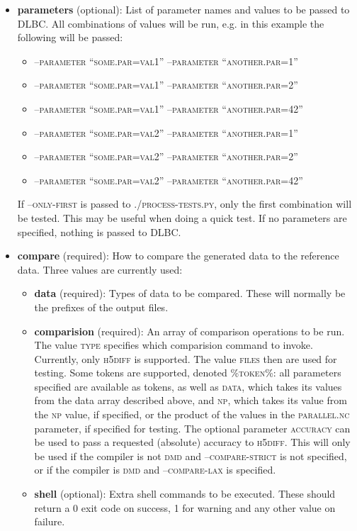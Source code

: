 \documentclass{article}
\begin{document}
\begin{itemize}
\item \textbf{parameters} (optional): List of parameter names and values to be passed to DLBC. All combinations of values will be run, e.g. in this example the following will be passed:
\begin{itemize}
\item \textsc{--parameter ``some.par=val1'' --parameter ``another.par=1''}
\item \textsc{--parameter ``some.par=val1'' --parameter ``another.par=2''}
\item \textsc{--parameter ``some.par=val1'' --parameter ``another.par=42''}
\item \textsc{--parameter ``some.par=val2'' --parameter ``another.par=1''}
\item \textsc{--parameter ``some.par=val2'' --parameter ``another.par=2''}
\item \textsc{--parameter ``some.par=val2'' --parameter ``another.par=42''}
\end{itemize}
If \textsc{--only-first} is passed to \textsc{./process-tests.py}, only the first combination will be tested. This may be useful when doing a quick test. If no parameters are specified, nothing is passed to DLBC.
\item \textbf{compare} (required): How to compare the generated data to the reference data. Three values are currently used:
\begin{itemize}
\item \textbf{data} (required): Types of data to be compared. These will normally be the prefixes of the output files.
\item \textbf{comparision} (required): An array of comparison operations to be run. The value \textsc{type} specifies which comparision command to invoke. Currently, only \textsc{h5diff} is supported. The value \textsc{files} then are used for testing. Some tokens are supported, denoted \textsc{\%token\%}: all parameters specified are available as tokens, as well as \textsc{data}, which takes its values from the data array described above, and \textsc{np}, which takes its value from the \textsc{np} value, if specified, or the product of the values in the \textsc{parallel.nc} parameter, if specified for testing. The optional parameter \textsc{accuracy} can be used to pass a requested (absolute) accuracy to \textsc{h5diff}. This will only be used if the compiler is not \textsc{dmd} and \textsc{--compare-strict} is not specified, or if the compiler is \textsc{dmd} and \textsc{--compare-lax} is specified.
\item \textbf{shell} (optional): Extra shell commands to be executed. These should return a 0 exit code on success, 1 for warning and any other value on failure.

\end{itemize}
\end{itemize}
\end{document}
